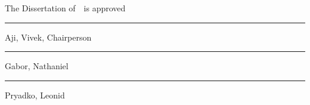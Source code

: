 \newcommand{\signatureblock}[1]{%
  \begin{minipage}{10cm}
    \hrule\smallskip #1
  \end{minipage}
}

\clearpage
\thispagestyle{empty}
\centering
\vspace*{-\toptafiddle}

The Dissertation of~\theauthor~is approved

\vfill

\signatureblock{Aji, Vivek, Chairperson}
\vfill
\signatureblock{Gabor, Nathaniel}
\vfill
\signatureblock{Pryadko, Leonid }

\vfill

\textsc{\theuniversity}

\enlargethispage{\bottafiddle}
\clearpage
